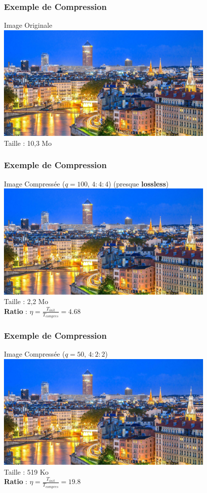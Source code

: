 \documentclass[aspectratio=43]{beamer}
\begin{document}
\begin{frame}
    \frametitle{Exemple de Compression}

    \centering
    Image Originale \\
    \includegraphics[width = 0.8\textwidth]{img/villeLyon.jpg} \\
    Taille : 10,3 Mo
\end{frame}

\begin{frame}
    \frametitle{Exemple de Compression}

    \centering
    Image Compressée ($q = 100$, $4:4:4$) (presque \textbf{lossless}) \\
    \includegraphics[width = 0.8\textwidth]{img/villeLyon.jpg} \\
    Taille : 2,2 Mo \\
    \textbf{Ratio} : $\eta = \frac{T_{init}}{T_{compres}} = 4.68 $

\end{frame}

\begin{frame}
    \frametitle{Exemple de Compression}

    \centering
    Image Compressée ($q = 50$, $4:2:2$) \\
    \includegraphics[width = 0.8\textwidth]{img/villeLyonMid.jpg} \\
    Taille : 519 Ko \\
    \textbf{Ratio} : $\eta = \frac{T_{init}}{T_{compres}} = 19.8$
    
\end{frame}
\end{document}

